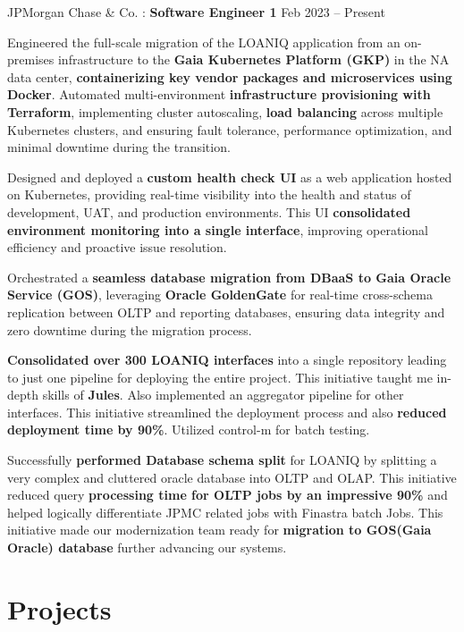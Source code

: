 \documentclass[letterpaper]{resume_config}
\begin{document}
\WorkExperience
    {JPMorgan Chase \& Co. : \textbf{Software Engineer 1}} %
    {} %
    {Feb 2023 -- Present} %
    {} %
    {
        \item Engineered the full-scale migration of the LOANIQ application from an on-premises infrastructure to the \textbf{Gaia Kubernetes Platform (GKP)} in the NA data center, \textbf{containerizing key vendor packages and microservices using Docker}. Automated multi-environment \textbf{infrastructure provisioning with Terraform}, implementing cluster autoscaling, \textbf{load balancing} across multiple Kubernetes clusters, and ensuring fault tolerance, performance optimization, and minimal downtime during the transition.
        \item Designed and deployed a \textbf{custom health check UI} as a web application hosted on Kubernetes, providing real-time visibility into the health and status of development, UAT, and production environments. This UI \textbf{consolidated environment monitoring into a single interface}, improving operational efficiency and proactive issue resolution.
        \item Orchestrated a \textbf{seamless database migration from DBaaS to Gaia Oracle Service (GOS)}, leveraging \textbf{Oracle GoldenGate} for real-time cross-schema replication between OLTP and reporting databases, ensuring data integrity and zero downtime during the migration process.
        \item \textbf{Consolidated over 300 LOANIQ interfaces} into a single repository leading to just one pipeline for deploying the entire project. This initiative taught me in-depth skills of \textbf{Jules}. Also implemented an aggregator pipeline for other interfaces. This initiative streamlined the deployment process and also \textbf{reduced deployment time by 90\%}. Utilized control-m for batch testing.
        \item Successfully \textbf{performed Database schema split} for LOANIQ by splitting a very complex and cluttered oracle database into OLTP and OLAP. This initiative reduced query \textbf{processing time for OLTP jobs by an impressive 90\%} and helped logically differentiate JPMC related jobs with Finastra  batch Jobs. This initiative made our modernization team ready for \textbf{migration to GOS(Gaia Oracle) database} further advancing our systems.
    } 
\vspace{-10pt}
\section{Projects}
\end{document}
